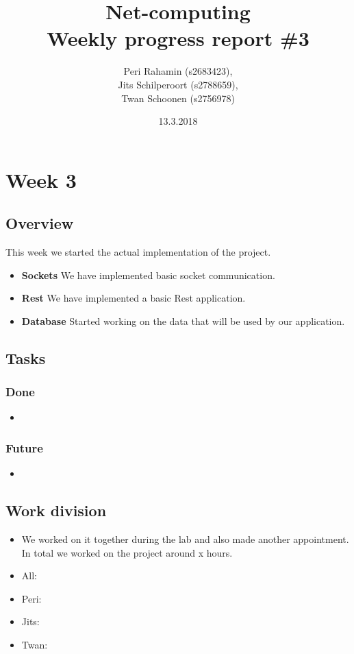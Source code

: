 \documentclass[a4paper]{article}
\begin{document}
\title{Net-computing\\
Weekly progress report \#3
}

\date{13.3.2018}

\author{Peri Rahamin (s2683423),\\
Jits Schilperoort (s2788659),\\
Twan Schoonen (s2756978)
}


\maketitle
\section*{Week 3}
\subsection*{Overview}
This week we started the actual implementation of the project. 
\begin{itemize}
	\item \textbf{Sockets} We have implemented basic socket communication.
	\item \textbf{Rest} We have implemented a basic Rest application.
	\item \textbf{Database} Started working on the data that will be used by our application.
\end{itemize}

\subsection*{Tasks}
\subsubsection*{Done}
\begin{itemize}
    \item
\end{itemize}

\subsubsection*{Future}
\begin{itemize}
    \item 
\end{itemize}

\subsection*{Work division}
\begin{itemize}
	\item We worked on it together during the lab and also made another appointment. In total we worked on the project around x hours. 
	\item All: 
    \item Peri:
    \item Jits:
    \item Twan:
\end{itemize}
\end{document}
